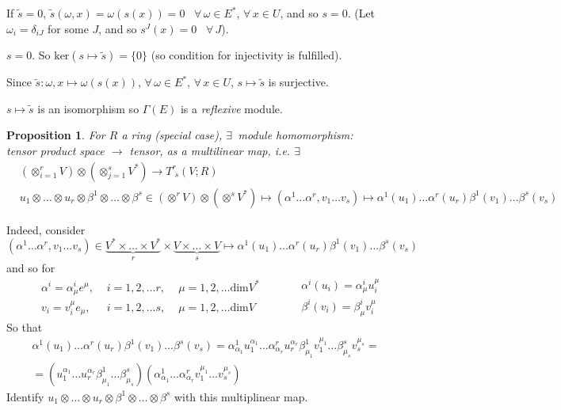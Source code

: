 \documentclass[10pt]{amsart}
\newtheorem{proposition}{Proposition}
\begin{document}
\begin{multicols*}{2}
If $\widetilde{s} =0$, $\widetilde{s}(\omega,x) = \omega(s(x)) =0$ \quad \, $\forall \, \omega \in E^*$, $\forall \, x\in U$, and so $s=0$.  (Let $\omega_i = \delta_{iJ}$ for some $J$, and so $s^J(x) =0$ \quad \, $\forall \, J$).  

$s=0$.  So $\text{ker}(s\mapsto \widetilde{s}) = \lbrace 0 \rbrace$ (so condition for injectivity is fulfilled).  

Since $\widetilde{s}:\omega,x\mapsto \omega(s(x))$, $\forall \, \omega \in E^*$, $\forall \, x \in U$, $s\mapsto \widetilde{s}$ is surjective.  

$s\mapsto \widetilde{s}$ is an isomorphism so $\Gamma(E)$ is a \emph{reflexive} module.  


\begin{proposition}
For $R$ a ring (special case), $\exists \, $ module homomorphism:  \\

tensor product space $\to $ tensor, as a multilinear map, i.e. $\exists$ \,  
\begin{equation}
\begin{aligned}
&	\left( \otimes_{i=1}^r V \right) \otimes \left( \otimes_{j=1}^s V^* \right) \to T^r_{ \, \, s}(V;R)   \\
& u_1 \otimes \dots \otimes u_r \otimes \beta^1 \otimes \dots \otimes \beta^s \in \left( \otimes^r V \right) \otimes \left( \otimes^s V^* \right) \mapsto (\alpha^1 \dots \alpha^r, v_1 \dots v_s) \mapsto \alpha^1(u_1) \dots \alpha^r(u_r) \beta^1(v_1) \dots \beta^s(v_s)  
\end{aligned}
\end{equation}
\end{proposition}

Indeed, consider 
\[
(\alpha^1 \dots \alpha^r, v_1 \dots v_s) \in \underbrace{V^* \times \dots \times V^* }_{r} \times \underbrace{ V\times \dots \times V}_{s} \mapsto \alpha^1(u_1) \dots \alpha^r(u_r) \beta^1(v_1) \dots \beta^s(v_s)
\]
and so for 
\[
\begin{aligned}
	& \alpha^i = \alpha^i_{\mu} e^{\mu} , \, & \, i =1,2, \dots r, \, & \, \mu = 1,2, \dots \text{dim}V^* \\ 
	& v_i = v_i^{\mu} e_{\mu} , \, & \, i = 1,2, \dots s, \, & \, \mu = 1, 2, \dots \text{dim}V 
\end{aligned} \qquad \, \begin{aligned}
& \alpha^i(u_i) = \alpha^i_{\mu} u^{\mu}_i \\ 
 & \beta^i(v_i) = \beta^i_{\mu} v^{\mu}_i
\end{aligned}
\]
So that 
\[
\begin{gathered}
	\alpha^1(u_1) \dots \alpha^r(u_r) \beta^1(v_1) \dots \beta^s(v_s) = \alpha^1_{\alpha_1}u^{\alpha_1}_1 \dots \alpha^r_{\alpha_r} u^{\alpha_r}_r \beta^1_{\mu_1} v^{\mu_1}_1 \dots \beta^s_{\mu_s} v^{\mu_s}_s = \\
	= (u^{\alpha_1}_1 \dots u_r^{\alpha_r} \beta^1_{\mu_1} \dots \beta^s_{\mu_s})(\alpha^1_{\alpha_1} \dots \alpha^r_{\alpha_r} v_1^{\mu_1} \dots v_s^{\mu_s} )
\end{gathered}
\]
Identify $u_1 \otimes \dots \otimes u_r \otimes \beta^1 \otimes \dots \otimes \beta^s$ with this multiplinear map.  


\end{multicols*}
\end{document}
